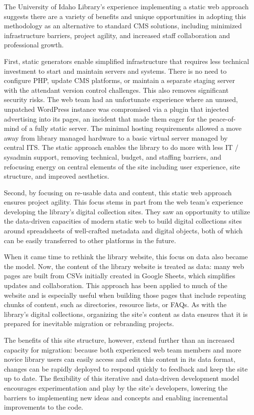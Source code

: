 \documentclass{book}
\begin{document}
The University of Idaho Library's experience implementing a static web
approach suggests there are a variety of benefits and unique opportunities in
adopting this methodology as an alternative to standard CMS solutions,
including minimized infrastructure barriers, project agility, and increased
staff collaboration and professional growth.

First, static generators enable simplified infrastructure that requires less
technical investment to start and maintain servers and systems. There is no
need to configure PHP, update CMS platforms, or maintain a separate staging
server with the attendant version control challenges. This also removes
significant security risks. The web team had an unfortunate experience where
an unused, unpatched WordPress instance was compromised via a plugin that
injected advertising into its pages, an incident that made them eager for the
peace-of-mind of a fully static server. The minimal hosting requirements
allowed a move away from library managed hardware to a basic virtual server
managed by central ITS. The static approach enables the library to do more
with less IT / sysadmin support, removing technical, budget, and staffing
barriers, and refocusing energy on central elements of the site including user
experience, site structure, and improved aesthetics.

Second, by focusing on re-usable data and content, this static web approach
ensures project agility. This focus stems in part from the web team's
experience developing the library's digital collection sites. They saw an
opportunity to utilize the data-driven capacities of modern static web to
build digital collections sites around spreadsheets of well-crafted metadata
and digital objects, both of which can be easily transferred to other
platforms in the future.

When it came time to rethink the library website, this focus on data also
became the model. Now, the content of the library website is treated as data:
many web pages are built from CSVs initially created in Google Sheets, which
simplifies updates and collaboration. This approach has been applied to much
of the website and is especially useful when building those pages that include
repeating chunks of content, such as directories, resource lists, or FAQs. As
with the library's digital collections, organizing the site's content as data
ensures that it is prepared for inevitable migration or rebranding projects.

The benefits of this site structure, however, extend further than an increased
capacity for migration: because both experienced web team members and more
novice library users can easily access and edit this content in its data
format, changes can be rapidly deployed to respond quickly to feedback and
keep the site up to date. The flexibility of this iterative and data-driven
development model encourages experimentation and play by the site's
developers, lowering the barriers to implementing new ideas and concepts and
enabling incremental improvements to the code.
\end{document}
